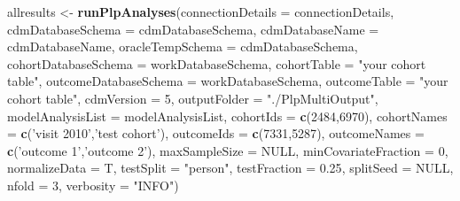 \documentclass[]{article}
\newenvironment{Shaded}{\begin{snugshade}}{\end{snugshade}}
\newcommand{\KeywordTok}[1]{\textcolor[rgb]{0.13,0.29,0.53}{\textbf{#1}}}
\newcommand{\DataTypeTok}[1]{\textcolor[rgb]{0.13,0.29,0.53}{#1}}
\newcommand{\DecValTok}[1]{\textcolor[rgb]{0.00,0.00,0.81}{#1}}
\newcommand{\FloatTok}[1]{\textcolor[rgb]{0.00,0.00,0.81}{#1}}
\newcommand{\StringTok}[1]{\textcolor[rgb]{0.31,0.60,0.02}{#1}}
\newcommand{\OtherTok}[1]{\textcolor[rgb]{0.56,0.35,0.01}{#1}}
\newcommand{\NormalTok}[1]{#1}
\begin{document}
\begin{Shaded}
\begin{Highlighting}[]
\NormalTok{allresults <-}\StringTok{ }\KeywordTok{runPlpAnalyses}\NormalTok{(}\DataTypeTok{connectionDetails =}\NormalTok{ connectionDetails,}
                           \DataTypeTok{cdmDatabaseSchema =}\NormalTok{ cdmDatabaseSchema,}
                           \DataTypeTok{cdmDatabaseName =}\NormalTok{ cdmDatabaseName,}
                           \DataTypeTok{oracleTempSchema =}\NormalTok{ cdmDatabaseSchema,}
                           \DataTypeTok{cohortDatabaseSchema =}\NormalTok{ workDatabaseSchema,}
                           \DataTypeTok{cohortTable =} \StringTok{"your cohort table"}\NormalTok{,}
                           \DataTypeTok{outcomeDatabaseSchema =}\NormalTok{ workDatabaseSchema,}
                           \DataTypeTok{outcomeTable =} \StringTok{"your cohort table"}\NormalTok{,}
                           \DataTypeTok{cdmVersion =} \DecValTok{5}\NormalTok{,}
                           \DataTypeTok{outputFolder =} \StringTok{"./PlpMultiOutput"}\NormalTok{,}
                           \DataTypeTok{modelAnalysisList =}\NormalTok{ modelAnalysisList,}
                           \DataTypeTok{cohortIds =} \KeywordTok{c}\NormalTok{(}\DecValTok{2484}\NormalTok{,}\DecValTok{6970}\NormalTok{),}
                           \DataTypeTok{cohortNames =} \KeywordTok{c}\NormalTok{(}\StringTok{'visit 2010'}\NormalTok{,}\StringTok{'test cohort'}\NormalTok{),}
                           \DataTypeTok{outcomeIds =} \KeywordTok{c}\NormalTok{(}\DecValTok{7331}\NormalTok{,}\DecValTok{5287}\NormalTok{),}
                           \DataTypeTok{outcomeNames =}  \KeywordTok{c}\NormalTok{(}\StringTok{'outcome 1'}\NormalTok{,}\StringTok{'outcome 2'}\NormalTok{),}
                           \DataTypeTok{maxSampleSize =} \OtherTok{NULL}\NormalTok{,}
                           \DataTypeTok{minCovariateFraction =} \DecValTok{0}\NormalTok{,}
                           \DataTypeTok{normalizeData =}\NormalTok{ T,}
                           \DataTypeTok{testSplit =} \StringTok{"person"}\NormalTok{,}
                           \DataTypeTok{testFraction =} \FloatTok{0.25}\NormalTok{,}
                           \DataTypeTok{splitSeed =} \OtherTok{NULL}\NormalTok{,}
                           \DataTypeTok{nfold =} \DecValTok{3}\NormalTok{,}
                           \DataTypeTok{verbosity =} \StringTok{"INFO"}\NormalTok{)}
\end{Highlighting}
\end{Shaded}
\end{document}
